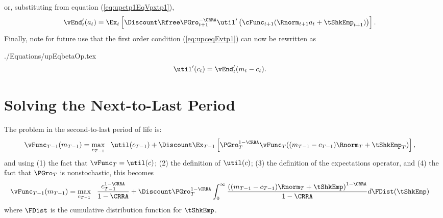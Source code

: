 \documentclass[titlepage]{\econtex}
\begin{document}
or, substituting from equation (\ref{eq:upctp1EqVpxtp1}),
\begin{equation}\begin{gathered}\begin{aligned}
  {\vEnd}_{t}^{\prime}({a}_{t})  & = \Ex_{t}\left[\Discount \Rfree \PGro_{t+1}^{-\CRRA} \util^{\prime}\left(\cFunc_{t+1}(\Rnorm_{t+1} {a}_{t}+{\tShkEmp}_{t+1})\right)\right].  \label{eq:vEndPrimetOfc}
\end{aligned}\end{gathered}\end{equation}
Finally, note for future use that the first order condition
(\ref{eq:upceqEvtp1}) can now be rewritten as
\begin{verbatimwrite}{./Equations/upEqbetaOp.tex}
  \begin{equation}\begin{gathered}\begin{aligned}
    \util^{\prime}({c}_{t})   & = {\vEnd}_{t}^{\prime}({m}_{t}-{c}_{t}).
                                   \label{eq:upEqbetaOp}
  \end{aligned}\end{gathered}\end{equation}
\end{verbatimwrite}



\hypertarget{Solving-the-Next-To-Last-Period}{}
\section{Solving the Next-to-Last Period}\label{sec:NextToLast}

The problem in the second-to-last period of life is:
\begin{equation*}\begin{gathered}\begin{aligned}
  \null{\vFunc}_{T-1}({m}_{T-1})  & = \max_{{c}_{T-1}} ~~ \util({c}_{T-1}) +
                                       \Discount \Ex_{T-1} \left[\PGro_{T}^{1-\CRRA}\null{\vFunc}_{T}(({m}_{T-1} - {c}_{T-1})\Rnorm_{T} + \tShkEmp_{T})\right],
\end{aligned}\end{gathered}\end{equation*}
and using (1) the fact that $\vFunc_{T}=\util(c)$; (2) the definition of $\util(c)$; (3) the
definition of the expectations operator, and (4) the fact that $\PGro_{T}$ is nonstochastic, this becomes
\begin{equation*}\begin{gathered}\begin{aligned}
  \null{\vFunc}_{T-1}({m}_{T-1})   & = \max_{{c}_{T-1}} ~~
                                        \frac{{c}_{T-1}^{1-\CRRA}}{1-\CRRA} + \Discount \PGro_{T}^{1-\CRRA}\int_{0}^{\infty}
                                        \frac{\left(({m}_{T-1}-{c}_{T-1})\Rnorm_{T}+ \tShkEmp\right)^{1-\CRRA}}{1-\CRRA}
                                        d\FDist(\tShkEmp)
\end{aligned}\end{gathered}\end{equation*}
where $\FDist$ is the cumulative distribution function for ${\tShkEmp}$.
\end{document}
